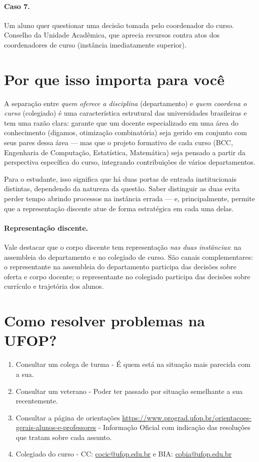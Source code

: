 \documentclass[10pt,a4paper]{extarticle}
\newcommand{\impt}[1]{\textcolor{important}{#1}}
\begin{document}
\paragraph{Caso 7.} Um aluno quer questionar uma decisão tomada pelo coordenador do curso.\\
\impt{Conselho da Unidade Acadêmica}, que aprecia recursos contra atos dos coordenadores de curso (instância imediatamente superior).

\section{Por que isso importa para você}

A separação entre \emph{quem oferece a disciplina} (departamento) e \emph{quem coordena o curso} (colegiado) é uma característica estrutural das universidades brasileiras e tem uma razão clara: garante que um docente especializado em uma área do conhecimento (digamos, otimização combinatória) seja gerido em conjunto com seus pares dessa área --- mas que o projeto formativo de cada curso (BCC, Engenharia de Computação, Estatística, Matemática) seja pensado a partir da perspectiva específica do curso, integrando contribuições de vários departamentos.

Para o estudante, isso significa que há \impt{duas portas de entrada} institucionais distintas, dependendo da natureza da questão. Saber distinguir as duas evita perder tempo abrindo processos na instância errada --- e, principalmente, permite que a representação discente atue de forma estratégica em cada uma delas.

\paragraph{Representação discente.} Vale destacar que o corpo discente tem representação \emph{nas duas instâncias}: na assembleia do departamento e no colegiado de curso. São canais complementares: o representante na assembleia do departamento participa das decisões sobre oferta e corpo docente; o representante no colegiado participa das decisões sobre currículo e trajetória dos alunos.

\section{Como resolver problemas na UFOP?}

\begin{enumerate}
    \item Consultar um colega de turma - É quem está na situação mais parecida com a sua. 
    \item Consultar um veterano - Poder ter passado por situação semelhante a sua recentemente.
    \item Consultar a página de orientações \url{https://www.prograd.ufop.br/orientacoes-gerais-alunos-e-professores} - Informação Oficial com indicação das resoluções que tratam sobre cada assunto.
    \item Colegiado do curso - CC: \url{cocic@ufop.edu.br} e BIA: \url{cobia@ufop.edu.br}   
\end{enumerate}
\end{document}
